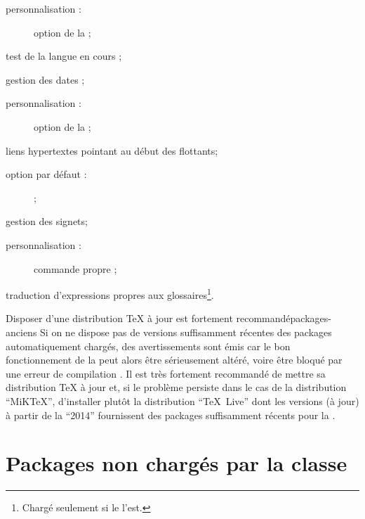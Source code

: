 \begin{description}
\begin{description}
  \item[personnalisation :] option  de la \yatcl ;
  \end{description}
\item[\package{iflang} :] test de la langue en cours ;
\item[\package*{datetime} :] gestion des dates ;
  \begin{description}
  \item[personnalisation :] option  de la \yatcl ;
  \end{description}
\item[\package{hypcap} :] liens hypertextes pointant au début des
  flottants\ifscreenoutput ;
  \begin{description}
  \item[option par défaut :]  ;
  \end{description}
\item[\package*{bookmark} :] gestion des signets\ifscreenoutput ;
  \begin{description}
  \item[personnalisation :]%
    commande propre  ;
  \end{description}
\item[\package{glossaries-babel} :] traduction d'expressions propres aux
  glossaires\footnote{Chargé seulement si le  l'est.}.
\end{description}

\begin{dbremark}{Disposer d'une distribution \TeX{} à jour est fortement
    recommandé}{packages-anciens}
  Si on ne dispose pas de versions suffisamment récentes des packages
  automatiquement chargés, des avertissements sont émis car le bon
  fonctionnement de la \yatcl{} peut alors être sérieusement altéré, voire être
  bloqué par une erreur de compilation . Il
  est très fortement recommandé de mettre sa distribution \TeX{} à jour et, si
  le problème persiste dans le cas de la distribution \enquote{MiK\TeX{}},
  d'installer plutôt la distribution \enquote{\TeX~Live} dont les versions (à
  jour) à partir de la \enquote{2014} fournissent des packages suffisamment
  récents pour la \yatcl.
\end{dbremark}

\section{Packages non  chargés par la classe}\label{sec:packages-non-charges}

